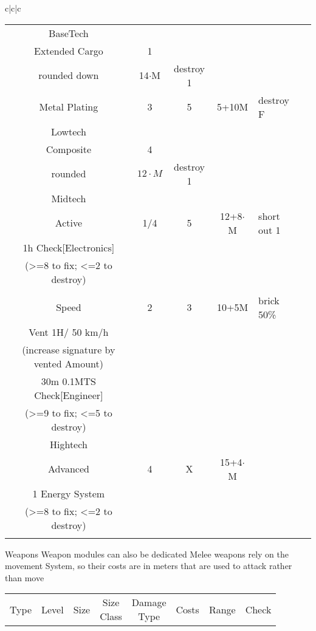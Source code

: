 \documentclass{article}
\begin{document}
\begin{tabular}{c|c|c}
\begin{tabular}{c|cccll}
        \hline BaseTech&&&&&\\
        Extended Cargo & 1 & \makecell{\(\sqrt{M}\)\\ rounded down}& 14\(\cdot\)M & destroy 1 & \makecell[{{p{6cm}}}]{7 Cargo Spaces (Cargo is destroyed with the modules)}\\
        Metal Plating & 3 & 5 & 5+10M & destroy F & \makecell[{{p{6cm}}}]{counts twice towards movement system percentage} \\
        \hline Lowtech &&&&&\\
        Composite & 4 & \makecell[c]{\(2\cdot\sqrt{M}\)\\ rounded}& \(12\cdot M\) & destroy 1&\\
        \hline Midtech &&&&&\\
        Active & 1/4 & 5 & 12+8\(\cdot\)M & short out 1 & \makecell[{{p{6cm}}}]{ draws 10 Energy when hit \\
        1h Check[Electronics] \\(>=8 to fix; <=2 to destroy)}\\&\\
        Speed & 2 & 3 & 10+5M & brick 50\% & \makecell[{{p{6cm}}}]{1E/50km/h; \\Vent 1H/ 50 km/h \\
        (increase signature by vented Amount) \\30m 0.1MTS Check[Engineer]\\(>=9 to fix; <=5 to destroy)}\\
        \hline Hightech &&&&&\\
        Advanced & 4 & X & 15+4\(\cdot\)M & \makecell[l]{shorts out \\ 1 Energy System}&\makecell[{{p{6cm}}}]{
        1h Check[Electronics] \\(>=8 to fix; <=2 to destroy)}\\&\\
    \end{tabular}
    Weapons\newline
    Weapon modules can also be dedicated\newline
    Melee weapons rely on the movement System, so their costs are in meters that are used to attack rather than move\newline
    \begin{tabular}{c|cccclll}
        Type & Level & Size &\makecell{Size\\Class} & \makecell{Damage\\Type} & Costs & Range &Check\\

\end{tabular}
\end{tabular}
\end{document}
